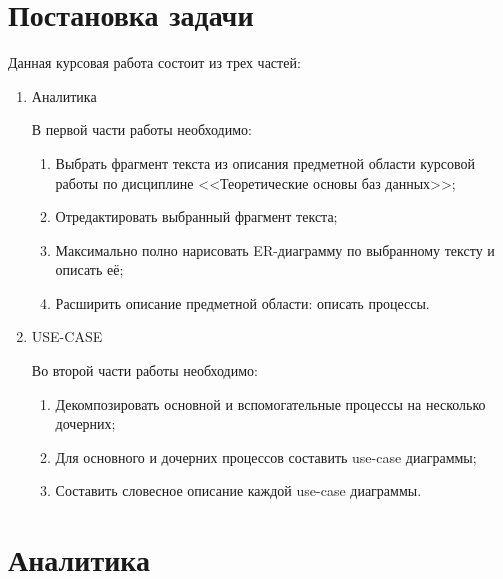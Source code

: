 \documentclass[12pt,a4paper,final]{article} %
\begin{document}
	
	\newpage
	\tableofcontents
	
	\newpage
\section{Постановка задачи}
\par Данная курсовая работа состоит из трех частей:

\begin{enumerate}
	\item Аналитика
	\par В первой части работы необходимо:
	\begin{enumerate}
		\item Выбрать фрагмент текста из описания предметной области курсовой работы по дисциплине <<Теоретические основы баз данных>>;
		\item Отредактировать выбранный фрагмент текста;
		\item Максимально полно нарисовать ER-диаграмму по выбранному тексту и описать её;
		\item Расширить описание предметной области: описать процессы.
	\end{enumerate}
	\item USE-CASE
	\par Во второй части работы необходимо:
		\begin{enumerate}
		\item Декомпозировать основной и вспомогательные процессы на несколько дочерних;
		\item Для основного и дочерних процессов составить use-case диаграммы;
		\item Составить словесное описание каждой use-case диаграммы.
	\end{enumerate}
\end{enumerate}
	
	\newpage
	\section{Аналитика}
\end{document}
